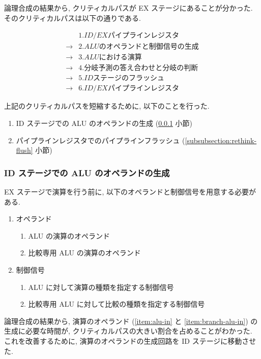 \documentclass[../improvements.tex]{subfiles}
\begin{document}
  論理合成の結果から, クリティカルパスが EX ステージにあることが分かった.
  そのクリティカルパスは以下の通りである.

  \begin{displaymath}
    \begin{aligned}
      &1. ID/EX パイプラインレジスタ \\
      \rightarrow &2. ALU のオペランドと制御信号の生成 \\
      \rightarrow &3. ALU における演算 \\
      \rightarrow &4. 分岐予測の答え合わせと分岐の判断 \\
      \rightarrow &5. ID ステージのフラッシュ \\
      \rightarrow &6. ID/EX パイプラインレジスタ
    \end{aligned}
  \end{displaymath}

  上記のクリティカルパスを短縮するために, 以下のことを行った.
  \begin{enumerate}
    \item ID ステージでの ALU のオペランドの生成 (\ref{subsubsection:ex-to-id} 小節)
    \item パイプラインレジスタでのパイプラインフラッシュ (\ref{subsubsection:rethink-flush} 小節)
  \end{enumerate}

  \subsubsection{ID ステージでの ALU のオペランドの生成} \label{subsubsection:ex-to-id}
  EX ステージで演算を行う前に, 以下のオペランドと制御信号を用意する必要がある.
  \begin{enumerate}
    \item オペランド
      \begin{enumerate}
        \item ALU の演算のオペランド \label{item:alu-in}
        \item 比較専用 ALU の演算のオペランド \label{item:branch-alu-in}
      \end{enumerate}
    \item 制御信号
      \begin{enumerate}
        \item ALU に対して演算の種類を指定する制御信号 \label{item:alu-op}
        \item 比較専用 ALU に対して比較の種類を指定する制御信号 \label{item:branch-alu-op}
      \end{enumerate}
  \end{enumerate}
  論理合成の結果から, 演算のオペランド (\ref{item:alu-in} と \ref{item:branch-alu-in}) の生成に必要な時間が, 
  クリティカルパスの大きい割合を占めることがわかった.
  これを改善するために, 演算のオペランドの生成回路を ID ステージに移動させた.
\end{document}
